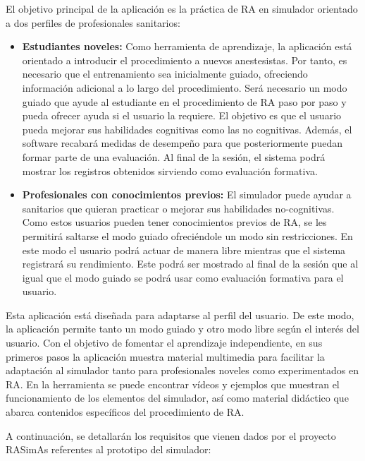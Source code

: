 El objetivo principal de la aplicación es la práctica de \ac{RA} en simulador orientado a dos perfiles de profesionales sanitarios:
\begin{itemize}
    \item \textbf{Estudiantes noveles:} Como herramienta de aprendizaje, la aplicación está orientado a introducir el procedimiento a nuevos anestesistas. Por tanto, es necesario que el entrenamiento sea inicialmente guiado, ofreciendo información adicional a lo largo del procedimiento. Será necesario un modo guiado que ayude al estudiante en el procedimiento de \ac{RA} paso por paso y pueda ofrecer ayuda si el usuario la requiere. El objetivo es que el usuario pueda mejorar sus habilidades cognitivas como las no cognitivas. Además, el software recabará medidas de desempeño para que posteriormente puedan formar parte de una evaluación. Al final de la sesión, el sistema podrá mostrar los registros obtenidos sirviendo como evaluación formativa.

\item \textbf{Profesionales con conocimientos previos:} El simulador puede ayudar a sanitarios que quieran practicar o mejorar sus habilidades no-cognitivas. Como estos usuarios pueden tener conocimientos previos de \ac{RA}, se les permitirá saltarse el modo guiado ofreciéndole un modo sin restricciones. En este modo el usuario podrá actuar de manera libre mientras que el sistema registrará su rendimiento. Este podrá ser mostrado al final de la sesión que al igual que el modo guiado se podrá usar como evaluación formativa para el usuario.

\end{itemize}


Esta aplicación está diseñada para adaptarse al perfil del usuario. De este modo, la aplicación permite tanto un modo guiado y otro modo libre según el interés del usuario. 
Con el objetivo de fomentar el aprendizaje independiente, en sus primeros pasos la aplicación muestra material multimedia para facilitar la adaptación al simulador tanto para profesionales noveles como experimentados en \ac{RA}. En la herramienta se puede encontrar vídeos y ejemplos que muestran el funcionamiento de los elementos del simulador, así como material didáctico que abarca contenidos específicos del procedimiento de \ac{RA}.



A continuación, se detallarán los requisitos que vienen dados por el proyecto \ac{RASimAs} referentes al prototipo del simulador:


